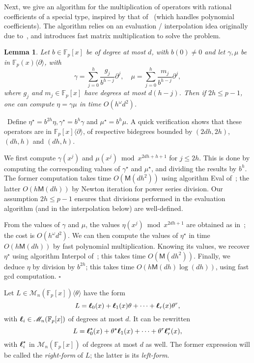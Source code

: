 \documentclass{sig-alternate}
\def\bell{\mbox{\boldmath$\ell$}}
\def\F {\mathbb{F}}
\def\M{\ensuremath{\mathsf{M}}}
\def\myproof{\noindent{\sc Proof.}~}
\def\foorp{\hfill$\square$}
\newtheorem{Lemma}{Lemma}
\begin{document}
\smallskip{} Next, we give an algorithm
for the multiplication of operators with rational coefficients of a
special type, inspired by that of~\cite{BoChLe08} (which handles
polynomial coefficients). The algorithm relies on an evaluation /
interpolation idea originally due to~\cite{vanDerHoeven02}, and 
introduces fast matrix multiplication to solve the problem.

\begin{Lemma}\label{lemma:mul}
  Let $b\in \F_p[x]$ be of degree at most $d$, with $b(0)\ne 0$ and
  let $\gamma,\mu$ be in $\F_p(x)\langle\partial \rangle$, with
  $$\gamma=\sum_{j=0}^{h} \frac{g_{j}}{b^{h-j}} \partial^j,\quad 
  \mu=\sum_{j=0}^{h} \frac{m_{j}}{b^{h-j}} \partial^j,$$ where $g_j$
  and $m_j\in \F_p[x]$ have degrees at most $d(h-j)$. Then if $2h \le
  p-1$, one can compute $\eta=\gamma \mu$ in time $O(h^\omega d^2)$.
\end{Lemma}
\myproof Define $\eta^\star = b^{2h} \eta,\gamma^\star = b^{h} \gamma$
and $\mu^\star = b^{h} \mu$. A quick verification shows that these
operators are in $\F_p[x]\langle \partial \rangle$, of respective
bidegrees bounded by $(2dh,2h)$, $(dh,h)$ and $(dh,h)$.

We first compute $\gamma(x^j)$ and $\mu(x^j) \bmod x^{2dh+h+1}$ for $j
\le 2h$. This is done by computing the corresponding values of
$\gamma^\star$ and $\mu^\star$, and dividing the results by $b^h$. The
former computation takes time $O(\M(dh^2))$ using algorithm {\sf Eval}
of~\cite{BoChLe08}; the latter $O(h\M(dh))$ by Newton iteration for
power series division. Our assumption $2h \le p-1$ ensures that
divisions performed in the evaluation algorithm (and in the
interpolation below) are well-defined.

From the values of $\gamma$ and $\mu$, the values $\eta(x^j)
\bmod x^{2dh+1}$ are obtained as in~\cite[Th. 3]{BoChLe08}; the cost is
$O(h^\omega d^2)$. We can then compute the values of $\eta^\star$ in
time $O(h\M(dh))$ by fast polynomial multiplication.  Knowing its
values, we recover $\eta^\star$ using algorithm {\sf Interpol}
of~\cite{BoChLe08}; this takes time $O(\M(dh^2))$. Finally, we deduce
$\eta$ by division by $b^{2h}$; this takes time $O(h\M(dh)\log(dh))$,
using fast gcd computation.  \foorp




\smallskip{} Let $L\in
\mathscr{M}_n(\F_p[x])\langle \theta\rangle$ have the form
$$L = \bell_0(x) + \bell_1(x) \theta + \cdots + \bell_r(x) \theta^r,$$
with $\bell_i \in \mathscr{M}_n(\F_p[x])$ of degrees at most $d$. It
can be rewritten
$$L = \bell^\star_0(x) +  \theta^\star \bell_1(x) + \cdots + \theta^r \bell^\star_r(x),$$
with $\bell^\star_i$ in $\mathscr{M}_n(\F_p[x])$ of degrees at most $d$
as well. The former expression will be called the {\em right-form} of
$L$; the latter is its {\em left-form}. 
\end{document}
